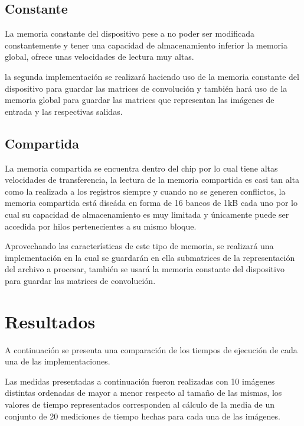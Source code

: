 \documentclass[journal]{IEEEtran}
\begin{document}
\subsection{Constante}
La memoria constante del dispositivo pese a no poder ser modificada constantemente y tener una capacidad de almacenamiento inferior la memoria global, ofrece unas velocidades de lectura muy altas.

la segunda implementaci\'on se realizar\'a haciendo uso de la memoria constante del dispositivo para guardar las matrices de convoluci\'on y tambi\'en har\'a uso de la memoria global para guardar las matrices que representan las im\'agenes de entrada y las respectivas salidas.


\subsection{Compartida}
La memoria compartida  se encuentra dentro del chip por lo cual tiene altas velocidades de transferencia, la lectura de la memoria compartida es casi tan alta como la realizada a los registros siempre y cuando no se generen conflictos, la memoria compartida est\'a dise\'ada en forma de 16 bancos de 1kB cada uno por lo cual su  capacidad de almacenamiento es muy limitada y \'unicamente puede ser accedida por hilos pertenecientes a su mismo bloque.

Aprovechando las caracter\'isticas de este tipo de memoria, se realizar\'a una implementaci\'on en la cual se guardar\'an en ella submatrices de la representaci\'on del archivo a procesar, tambi\'en se usar\'a  la memoria constante del dispositivo para guardar las matrices de convolución.


\section{Resultados}

A continuaci\'on se presenta  una comparaci\'on de los tiempos de ejecuci\'on de cada una de las implementaciones.

Las medidas presentadas a continuaci\'on fueron realizadas con 10 im\'agenes distintas ordenadas de mayor a menor respecto al tama\~no de las mismas, los valores de tiempo representados corresponden al c\'alculo de la media de un conjunto de 20 mediciones de tiempo hechas para cada una de las im\'agenes.
\end{document}
